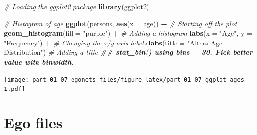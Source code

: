 \documentclass[
]{book}
\newenvironment{Shaded}{\begin{snugshade}}{\end{snugshade}}
\newcommand{\AttributeTok}[1]{\textcolor[rgb]{0.13,0.29,0.53}{#1}}
\newcommand{\CommentTok}[1]{\textcolor[rgb]{0.56,0.35,0.01}{\textit{#1}}}
\newcommand{\DocumentationTok}[1]{\textcolor[rgb]{0.56,0.35,0.01}{\textbf{\textit{#1}}}}
\newcommand{\FunctionTok}[1]{\textcolor[rgb]{0.13,0.29,0.53}{\textbf{#1}}}
\newcommand{\NormalTok}[1]{#1}
\newcommand{\SpecialCharTok}[1]{\textcolor[rgb]{0.81,0.36,0.00}{\textbf{#1}}}
\newcommand{\StringTok}[1]{\textcolor[rgb]{0.31,0.60,0.02}{#1}}
\begin{document}
\begin{Shaded}
\begin{Highlighting}[]
\CommentTok{\# Loading the ggplot2 package}
\FunctionTok{library}\NormalTok{(ggplot2)}

\CommentTok{\# Histogram of age}
\FunctionTok{ggplot}\NormalTok{(persons, }\FunctionTok{aes}\NormalTok{(}\AttributeTok{x =}\NormalTok{ age)) }\SpecialCharTok{+}            \CommentTok{\# Starting off the plot}
  \FunctionTok{geom\_histogram}\NormalTok{(}\AttributeTok{fill =} \StringTok{"purple"}\NormalTok{) }\SpecialCharTok{+}      \CommentTok{\# Adding a histogram}
  \FunctionTok{labs}\NormalTok{(}\AttributeTok{x =} \StringTok{"Age"}\NormalTok{, }\AttributeTok{y =} \StringTok{"Frequency"}\NormalTok{) }\SpecialCharTok{+}       \CommentTok{\# Changing the x/y axis labels}
  \FunctionTok{labs}\NormalTok{(}\AttributeTok{title =} \StringTok{"Alter\textquotesingle{}s Age Distribution"}\NormalTok{) }\CommentTok{\# Adding a title}
\DocumentationTok{\#\# \textasciigrave{}stat\_bin()\textasciigrave{} using \textasciigrave{}bins = 30\textasciigrave{}. Pick better value with \textasciigrave{}binwidth\textasciigrave{}.}
\end{Highlighting}
\end{Shaded}

\texttt{[image: part-01-07-egonets\_files/figure-latex/part-01-07-ggplot-ages-1.pdf]}

\hypertarget{ego-files}{%
\section{Ego files}\label{ego-files}}
\end{document}

